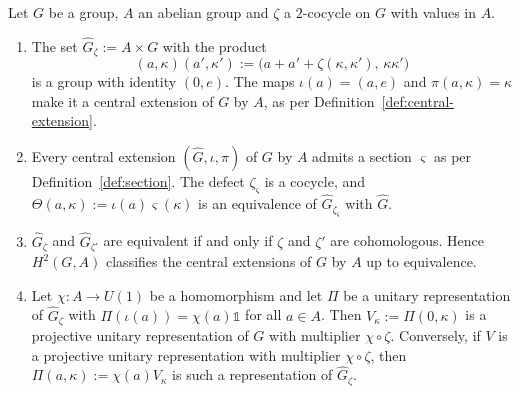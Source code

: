 \begin{proposition}\label{prop:cocycle-extension}
	Let $G$ be a group, $A$ an abelian group and $\zeta$ a $2$-cocycle on $G$ with values in $A$.
	\begin{enumerate}
		\item The set $\widehat{G}_\zeta:=A\times G$ with the product
		\begin{equation*}
			(a,\kappa)(a',\kappa'):=\big(a+a'+\zeta(\kappa,\kappa'),\,\kappa\kappa'\big)
		\end{equation*}
		is a group with identity $(0,e)$. The maps $\iota(a)=(a,e)$ and $\pi(a,\kappa)=\kappa$ make it a central extension of $G$ by $A$, as per Definition~\ref{def:central-extension}.
		\item Every central extension $(\widehat{G},\iota,\pi)$ of $G$ by $A$ admits a section $\varsigma$ as per Definition~\ref{def:section}. The defect $\zeta_\varsigma$ is a cocycle, and $\Theta(a,\kappa):=\iota(a)\varsigma(\kappa)$ is an equivalence of $\widehat{G}_{\zeta_\varsigma}$ with $\widehat{G}$.
		\item $\widehat{G}_\zeta$ and $\widehat{G}_{\zeta'}$ are equivalent if and only if $\zeta$ and $\zeta'$ are cohomologous. Hence $H^2(G,A)$ classifies the central extensions of $G$ by $A$ up to equivalence.
		\item Let $\chi:A\to U(1)$ be a homomorphism and let $\Pi$ be a unitary representation of $\widehat{G}_\zeta$ with $\Pi(\iota(a))=\chi(a)\mathbb{1}$ for all $a\in A$. Then $V_\kappa:=\Pi(0,\kappa)$ is a projective unitary representation of $G$ with multiplier $\chi\circ\zeta$. Conversely, if $V$ is a projective unitary representation with multiplier $\chi\circ\zeta$, then $\Pi(a,\kappa):=\chi(a)V_\kappa$ is such a representation of $\widehat{G}_\zeta$.
	\end{enumerate}
\end{proposition}

